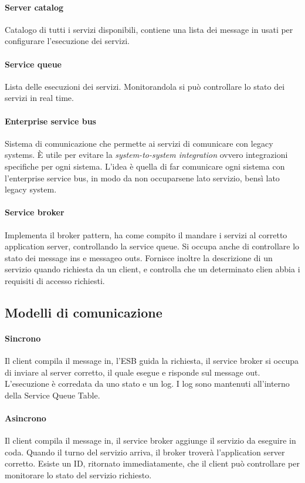 \paragraph{Server catalog}
Catalogo di tutti i servizi disponibili, contiene una lista dei message in usati 
per configurare l'esecuzione dei servizi.

\paragraph{Service queue}
Lista delle esecuzioni dei servizi. Monitorandola si può controllare lo stato dei 
servizi in real time.

\paragraph{Enterprise service bus}
Sistema di comunicazione che permette ai servizi di comunicare con legacy systems.
È utile per evitare la \emph{system-to-system integration} ovvero integrazioni specifiche
per ogni sistema. L'idea è quella di far comunicare ogni sistema con l'enterprise 
service bus, in modo da non occuparsene lato servizio, bensì lato legacy system.

\paragraph{Service broker}
Implementa il broker pattern, ha come compito il mandare 
i servizi al corretto application server, controllando la service queue.
Si occupa anche di controllare lo stato dei message ins e messageo outs.
Fornisce inoltre la descrizione di un servizio quando richiesta da un client, 
e controlla che un determinato clien abbia i requisiti di accesso richiesti.

\subsection{Modelli di comunicazione}
\paragraph{Sincrono}
Il client compila il message in, l'ESB guida la richiesta, il service broker si occupa di 
inviare al server corretto, il quale esegue e risponde sul message out. L'esecuzione
è corredata da uno stato e un log. I log sono mantenuti all'interno della Service Queue Table.

\paragraph{Asincrono}
Il client compila il message in, il service broker aggiunge il servizio da eseguire in 
coda. Quando il turno del servizio arriva, il broker troverà l'application server corretto.
Esiste un ID, ritornato immediatamente, che il client può controllare per monitorare lo stato del servizio 
richiesto.

